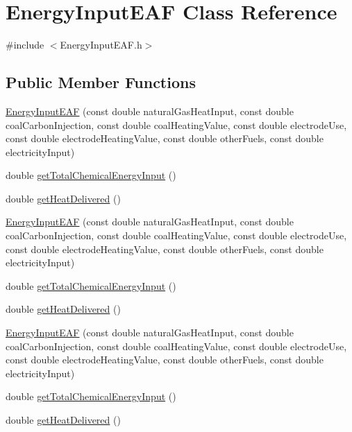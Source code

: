 \hypertarget{class_energy_input_e_a_f}{}\section{Energy\+Input\+E\+AF Class Reference}
\label{class_energy_input_e_a_f}


{\ttfamily \#include $<$Energy\+Input\+E\+A\+F.\+h$>$}

\subsection*{Public Member Functions}
\begin{DoxyCompactItemize}
\item 
\hyperlink{class_energy_input_e_a_f_a385f7047f5019124d7559cdbcb229a04}{Energy\+Input\+E\+AF} (const double natural\+Gas\+Heat\+Input, const double coal\+Carbon\+Injection, const double coal\+Heating\+Value, const double electrode\+Use, const double electrode\+Heating\+Value, const double other\+Fuels, const double electricity\+Input)
\item 
double \hyperlink{class_energy_input_e_a_f_a44b4a70dcc3e5f0bf9d33eabd6158b2f}{get\+Total\+Chemical\+Energy\+Input} ()
\item 
double \hyperlink{class_energy_input_e_a_f_ad1916eba02c6036a603cf34420169911}{get\+Heat\+Delivered} ()
\item 
\hyperlink{class_energy_input_e_a_f_a385f7047f5019124d7559cdbcb229a04}{Energy\+Input\+E\+AF} (const double natural\+Gas\+Heat\+Input, const double coal\+Carbon\+Injection, const double coal\+Heating\+Value, const double electrode\+Use, const double electrode\+Heating\+Value, const double other\+Fuels, const double electricity\+Input)
\item 
double \hyperlink{class_energy_input_e_a_f_a44b4a70dcc3e5f0bf9d33eabd6158b2f}{get\+Total\+Chemical\+Energy\+Input} ()
\item 
double \hyperlink{class_energy_input_e_a_f_ad1916eba02c6036a603cf34420169911}{get\+Heat\+Delivered} ()
\item 
\hyperlink{class_energy_input_e_a_f_a385f7047f5019124d7559cdbcb229a04}{Energy\+Input\+E\+AF} (const double natural\+Gas\+Heat\+Input, const double coal\+Carbon\+Injection, const double coal\+Heating\+Value, const double electrode\+Use, const double electrode\+Heating\+Value, const double other\+Fuels, const double electricity\+Input)
\item 
double \hyperlink{class_energy_input_e_a_f_a44b4a70dcc3e5f0bf9d33eabd6158b2f}{get\+Total\+Chemical\+Energy\+Input} ()
\item 
double \hyperlink{class_energy_input_e_a_f_ad1916eba02c6036a603cf34420169911}{get\+Heat\+Delivered} ()
\end{DoxyCompactItemize}


